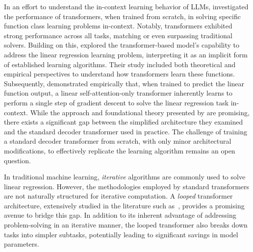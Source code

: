 \documentclass{article} %
\theoremstyle{plain}
\theoremstyle{definition}
\theoremstyle{remark}
\begin{document}
In an effort to understand the in-context learning behavior of LLMs, \citet{Garg2022WhatCT} investigated the performance of transformers, when trained from scratch, in solving specific function class learning problems in-context. Notably, transformers exhibited strong performance across all tasks, matching or even surpassing traditional solvers. Building on this, \citet{Akyrek2022WhatLA} explored the transformer-based model's capability to address the linear regression learning problem, interpreting it as an implicit form of established learning algorithms. Their study included both theoretical and empirical perspectives to understand how transformers learn these functions. 
Subsequently, \citet{Oswald2022TransformersLI} demonstrated empirically that, when trained to predict the linear function output, a linear self-attention-only transformer inherently learns to perform a single step of gradient descent to solve the linear regression task in-context.
While the approach and foundational theory presented by \citet{Oswald2022TransformersLI} are promising, there exists a significant gap between the simplified architecture they examined and the standard decoder transformer used in practice.
The challenge of training a standard decoder transformer from scratch, with only minor architectural modifications, to effectively replicate the learning algorithm remains an open question.

In traditional machine learning, \emph{iterative} algorithms are commonly used to solve linear regression. However, the methodologies employed by standard transformers are not naturally structured for iterative computation. A \emph{looped} transformer architecture, extensively studied in the literature such as~\citet{Giannou2023LoopedTA}, provides a promising avenue to bridge this gap.
In addition to its inherent advantage of addressing problem-solving in an iterative manner, the looped transformer also breaks down tasks into simpler subtasks, potentially leading to significant savings in model parameters.
\end{document}
